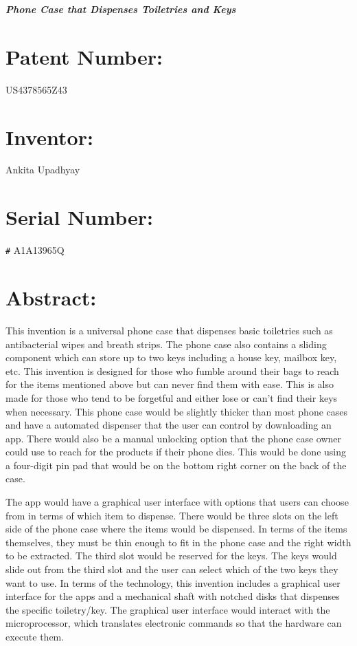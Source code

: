 \documentclass[11pt]{article}
\begin{document}
\hspace{-1cm} \LARGE{\textbf{\textit{Phone Case that Dispenses Toiletries and Keys}}}

\LARGE{\textbf{\textit{}}}

\section*{Patent Number:}
\large{US4378565Z43}

\section*{Inventor:}
\large{Ankita Upadhyay}

\section*{Serial Number:}
\large{\verb|#| A1A13965Q}

\section*{Abstract:}
\large{This invention is a universal phone case that dispenses basic toiletries such as antibacterial wipes and breath strips. The phone case also contains a sliding component which can store up to two keys including a house key, mailbox key, etc. This invention is designed for those who fumble around their bags to reach for the items mentioned above but can never find them with ease. This is also made for those who tend to be forgetful and either lose or can't find their keys when necessary. This phone case would be slightly thicker than most phone cases and have a automated dispenser that the user can control by downloading an app. There would also be a manual unlocking option that the phone case owner could use to reach for the products if their phone dies. This would be done using a four-digit pin pad that would be on the bottom right corner on the back of the case.

The app would have a graphical user interface with options that users can choose from in terms of which item to dispense. There would be three slots on the left side of the phone case where the items would be dispensed. In terms of the items themselves, they must be thin enough to fit in the phone case and the right width to be extracted. The third slot would be reserved for the keys. The keys would slide out from the third slot and the user can select which of the two keys they want to use. In terms of the technology, this invention includes a graphical user interface for the apps and a mechanical shaft with notched disks that dispenses the specific toiletry/key. The graphical user interface would interact with the microprocessor, which translates electronic commands so that the hardware can execute them. 
}
\end{document}

